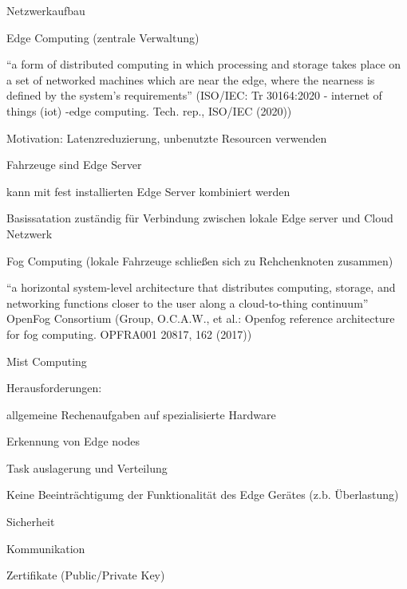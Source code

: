 \begin{notes}
    \item Netzwerkaufbau
    \begin{notes}
        \item Edge Computing (zentrale Verwaltung)
        \begin{notes}
            \item “a form of distributed computing in which processing and storage takes place on a set of networked machines which are near the edge, where the nearness is defined by the system’s requirements”  (ISO/IEC: Tr 30164:2020 - internet of things (iot) -edge computing. Tech. rep., ISO/IEC (2020))
            \item Motivation: Latenzreduzierung, unbenutzte Resourcen verwenden
            \item Fahrzeuge sind Edge Server
            \item kann mit fest installierten Edge Server kombiniert werden
            \item Basissatation zuständig für Verbindung zwischen lokale Edge server und Cloud Netzwerk 
        \end{notes}
        \item Fog Computing (lokale Fahrzeuge schließen sich zu Rehchenknoten zusammen)
        \item “a horizontal system-level architecture that distributes computing, storage, and networking functions closer to the user along a cloud-to-thing continuum”  OpenFog Consortium (Group, O.C.A.W., et al.: Openfog reference architecture for fog computing. OPFRA001 20817, 162 (2017))
        \item Mist Computing
        \item Herausforderungen:
        \begin{notes}
            \item allgemeine Rechenaufgaben auf spezialisierte Hardware
            \item Erkennung von Edge nodes
            \item Task auslagerung und Verteilung
            \item Keine Beeinträchtigumg der Funktionalität des Edge Gerätes (z.b. Überlastung)
            \item Sicherheit
        \end{notes}
    \end{notes}
    \item Kommunikation
    \begin{notes}
        \item Zertifikate (Public/Private Key)

\end{notes}
\end{notes}
